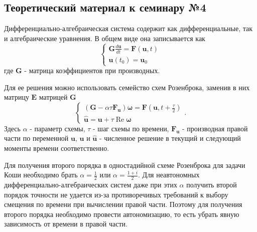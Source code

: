 \chapter{}

\section{Теоретический материал к семинару №4}

Дифференциально-алгебраическая система содержит как дифференциальные, так и алгебраические уравнения. В общем виде она записывается как
\begin{equation} \label{c4eq1}
	\begin{cases}
		\displaystyle \mathbf{G} \frac{d\mathbf{u}}{dt} = \mathbf{F} \left( \mathbf{u}, t \right) \\
		\mathbf{u}(t_0) = \mathbf{u}_0
	\end{cases}
\end{equation}
где $\mathbf{G}$ - матрица коэффициентов при производных. 

Для ее решения можно использовать семейство схем Розенброка, заменив в них матрицу $\mathbf{E}$ матрицей $\mathbf{G}$  
\begin{equation} \label{c4eq2}
	\begin{cases}
		\displaystyle \left( \mathbf{G} - \alpha \tau \mathbf{F_u} \right) \boldsymbol{\omega} = \mathbf{F} \left( \mathbf{u}, t + \frac{\tau}{2} \right) \\
		\mathbf{\hat{u}} = \mathbf{u} + \tau \operatorname{Re} \boldsymbol{\omega}
	\end{cases}.
\end{equation}
Здесь $\alpha$ - параметр схемы, $\tau$ - шаг схемы по времени, $\mathbf{F_u}$ - производная правой части по переменной $\mathbf{u}$, $\mathbf{u}$ и $\mathbf{\hat{u}}$ - численное решение в текущий и следующий моменты времени соответственно.

Для получения второго порядка в одностадийной схеме Розенброка для задачи Коши необходимо брать
$\alpha = \frac{1}{2}$ или $\alpha = \frac{1+i}{2}$. Для неавтономных дифференциально-алгебраических систем даже при этих $\alpha$ получить второй порядок точности не удается из-за противоречивых требований к выбору смещения по времени при вычислении правой части. Поэтому для получения второго порядка необходимо провести автономизацию, то есть убрать явную зависимость от времени в правой части.

\newpage

